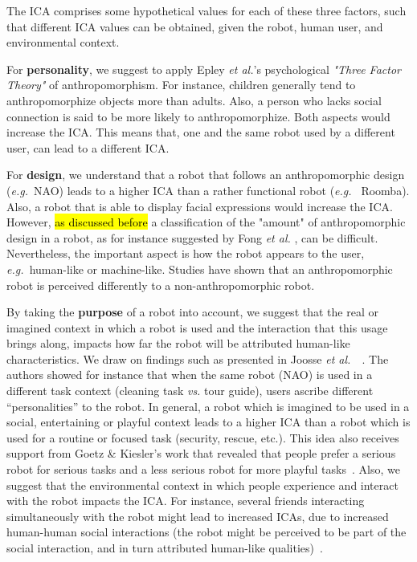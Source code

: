 \documentclass{frontiersSCNS} %
\newcommand{\eg}{{\textit{e.g.~}}}
\newcommand{\etal}{{\textit{et al.~}}}
\begin{document}
The ICA comprises some hypothetical values for each of these three factors, such
that different ICA values can be obtained, given the robot, human user, and
environmental context.

For \textbf{personality}, we suggest to apply Epley \textit{et al.}'s
\cite{epley_seeing_2007} psychological \textit{"Three Factor Theory"} of
anthropomorphism. For instance, children generally tend to anthropomorphize
objects more than adults. Also, a person who lacks social connection is said to
be more likely to anthropomorphize. Both aspects would increase the ICA. This
means that, one and the same robot used by a different user, can lead to a
different ICA.

For \textbf{design}, we understand that a robot that follows an anthropomorphic
design (\eg NAO) leads to a higher ICA than a rather functional robot (\eg
Roomba). Also, a robot that is able to display facial expressions would increase
the ICA. However, \hl{as discussed before} a classification of the "amount" of
anthropomorphic design in a robot, as for instance suggested by Fong \textit{et
al.} \cite{fong_survey_2003}, can be difficult. Nevertheless, the important
aspect is how the robot appears to the user, \eg human-like or machine-like.
Studies have shown that an anthropomorphic robot is perceived differently to a
non-anthropomorphic robot.

By taking the \textbf{purpose} of a robot into account, we suggest that the real
or imagined context in which a robot is used and the interaction that this usage
brings along, impacts how far the robot will be attributed human-like
characteristics. We draw on findings such as presented in Joosse
\etal~\cite{joosse_what_2013}. The authors showed for instance that when the
same robot (NAO) is used in a different task context (cleaning task \emph{vs.}
tour guide), users ascribe different ``personalities'' to the robot. In general,
a robot which is imagined to be used in a social, entertaining or playful
context leads to a higher ICA than a robot which is used for a routine or
focused task (security, rescue, etc.). This idea also receives support from
Goetz \& Kiesler's work that revealed that people prefer a serious robot for
serious tasks and a less serious robot for more playful
tasks~\cite{goetz_cooperation_2002, goetz_matching_2003}. Also, we suggest that
the environmental context in which people experience and interact with the robot
impacts the ICA. For instance, several friends interacting simultaneously with
the robot might lead to increased ICAs, due to increased human-human social
interactions (the robot might be perceived to be part of the social interaction,
and in turn attributed human-like qualities)~\cite{baxter2013do}.
\end{document}
